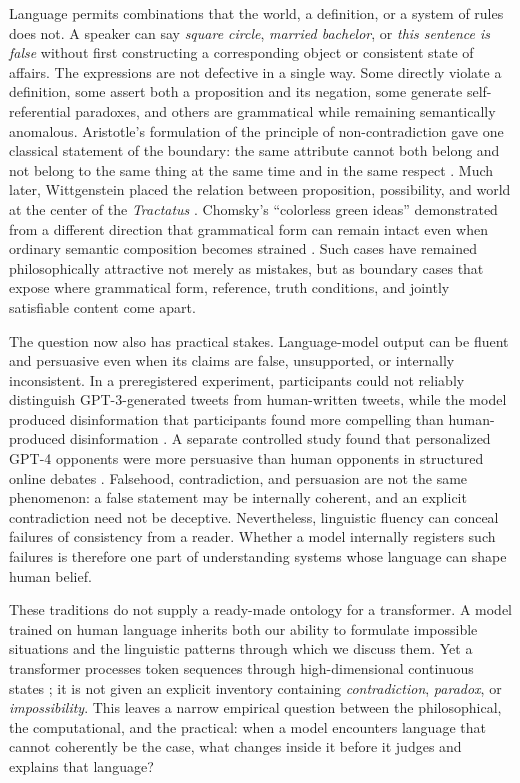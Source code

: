 \documentclass[pdflatex,sn-nature]{sn-jnl}
\begin{document}
Language permits combinations that the world, a definition, or a system of rules does not. A speaker can say \emph{square circle}, \emph{married bachelor}, or \emph{this sentence is false} without first constructing a corresponding object or consistent state of affairs. The expressions are not defective in a single way. Some directly violate a definition, some assert both a proposition and its negation, some generate self-referential paradoxes, and others are grammatical while remaining semantically anomalous. Aristotle's formulation of the principle of non-contradiction gave one classical statement of the boundary: the same attribute cannot both belong and not belong to the same thing at the same time and in the same respect \cite{aristotle1984}. Much later, Wittgenstein placed the relation between proposition, possibility, and world at the center of the \emph{Tractatus} \cite{wittgenstein1922}. Chomsky's ``colorless green ideas'' demonstrated from a different direction that grammatical form can remain intact even when ordinary semantic composition becomes strained \cite{chomsky1957}. Such cases have remained philosophically attractive not merely as mistakes, but as boundary cases that expose where grammatical form, reference, truth conditions, and jointly satisfiable content come apart.

The question now also has practical stakes. Language-model output can be fluent and persuasive even when its claims are false, unsupported, or internally inconsistent. In a preregistered experiment, participants could not reliably distinguish GPT-3-generated tweets from human-written tweets, while the model produced disinformation that participants found more compelling than human-produced disinformation \cite{spitale2023}. A separate controlled study found that personalized GPT-4 opponents were more persuasive than human opponents in structured online debates \cite{salvi2025}. Falsehood, contradiction, and persuasion are not the same phenomenon: a false statement may be internally coherent, and an explicit contradiction need not be deceptive. Nevertheless, linguistic fluency can conceal failures of consistency from a reader. Whether a model internally registers such failures is therefore one part of understanding systems whose language can shape human belief.

These traditions do not supply a ready-made ontology for a transformer. A model trained on human language inherits both our ability to formulate impossible situations and the linguistic patterns through which we discuss them. Yet a transformer processes token sequences through high-dimensional continuous states \cite{vaswani2017}; it is not given an explicit inventory containing \emph{contradiction}, \emph{paradox}, or \emph{impossibility}. This leaves a narrow empirical question between the philosophical, the computational, and the practical: when a model encounters language that cannot coherently be the case, what changes inside it before it judges and explains that language?
\end{document}
